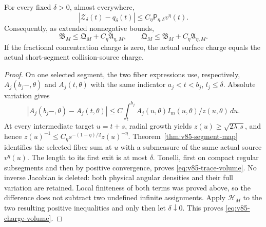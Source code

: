 \begin{theorem}
\label{thm:v85-trace-volume}
For every fixed $\delta>0$, almost everywhere,
\begin{equation}\label{eq:v85-trace-volume}
 |\mathcal Z_\delta(t)-q_\delta(t)|
                      \le C_\eta\mathsf P_{\eta,\delta}v^\eta(t).
\end{equation}
Consequently, as extended nonnegative bounds,
\begin{equation}\label{eq:v85-charge-volume}
 \mathfrak B_M\le\mathfrak Q_M+C_\eta\mathfrak A_{\eta,M},
 \qquad
 \mathfrak Q_M\le\mathfrak B_M+C_\eta\mathfrak A_{\eta,M}.
\end{equation}
If the fractional concentration charge is zero, the actual surface
charge equals the actual short-segment collision-source charge.
\end{theorem}
\begin{proof}
On one selected segment, the two fiber expressions use, respectively,
$A_j(b_j-,\theta)$ and $A_j(t,\theta)$ with the same indicator
$a_j<t<b_j$, $l_j\le\delta$. Absolute variation gives
\[
 |A_j(b_j-,\theta)-A_j(t,\theta)|
       \le C\int_t^{b_j} A_j(u,\theta)I_m(u,\theta)/z(u,\theta)\,du.
\]
At every intermediate target $u=t+s$, radial growth yields
$z(u)\ge\sqrt{2\lambda_\circ s}$, and hence
$z(u)^{-1}\le C_\eta s^{-(1-\eta)/2}z(u)^{-\eta}$.
Theorem~\ref{thm:v85-segment-map} identifies the selected fiber sum
at $u$ with a submeasure of the same actual source $v^\eta(u)$.
The length to its first exit is at most $\delta$. Tonelli, first on
compact regular subsegments and then by positive convergence, proves
\eqref{eq:v85-trace-volume}. No inverse Jacobian is deleted: both
physical angular densities and their full variation are retained.
Local finiteness of both terms was proved above, so the difference
does not subtract two undefined infinite assignments. Apply
$\mathcal H_M$ to the two resulting positive inequalities and only
then let $\delta\downarrow0$. This proves
\eqref{eq:v85-charge-volume}.
\end{proof}

